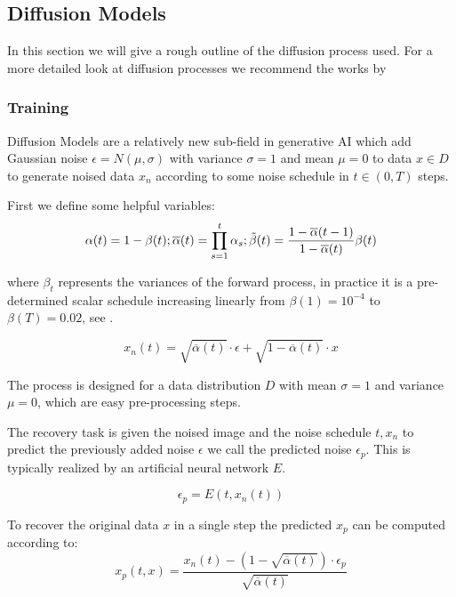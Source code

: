 \subsection{Diffusion Models}
In this section we will give a rough outline of the diffusion process used. For a more detailed look at diffusion processes we recommend the works by \cite{ddpm, ddim}
\subsubsection{Training}
Diffusion Models are a relatively new sub-field in generative AI which add Gaussian noise $\epsilon = N(\mu,\sigma)$ with variance $\sigma = 1$ and mean $\mu = 0$ to data $x \in D$ to generate noised data $x_n$ according to some noise schedule in $t \in (0,T)$ steps.

First we define some helpful variables:
\begin{equation}
   \alpha(t) = 1-\beta(t)  ;
   \overline{\alpha}(t) = \prod_{s=1}^t \alpha_s ;
   \Tilde{\beta}(t) = \frac{1-\overline{\alpha}(t-1)}{1-\overline{\alpha}(t)}\beta(t)
\end{equation}

where $\beta_t$ represents the variances of the forward process, in practice it is a pre-determined scalar schedule increasing linearly from $\beta(1) = 10^{-4}$ to $\beta(T) = 0.02$, see \cite{ddpm}.

\begin{equation}
    x_n(t) = \sqrt{\overline{\alpha}(t)} \cdot \epsilon + \sqrt{1-\overline{\alpha}(t)}\cdot x
\end{equation}

The process is designed for a data distribution $D$ with mean $\sigma = 1$ and variance $\mu = 0$, which are easy pre-processing steps. 


The recovery task is given the noised image and the noise schedule $t,x_n$ to predict the previously added noise $\epsilon$ we call the predicted noise $\epsilon_p$. This is typically realized by an artificial neural network $E$. 

\begin{equation}
     \epsilon_{p} = E(t,x_n(t))
     \label{eq:nn}
\end{equation}

To recover the original data $x$ in a single step the predicted $x_p$ can be computed according to:
\begin{equation}
    x_p(t,x) = \frac{x_n(t) - (1-\sqrt{\overline{\alpha}(t)}) \cdot \epsilon_p}{\sqrt{\overline{\alpha}(t)}}
    \label{eq:denoise}
\end{equation}

